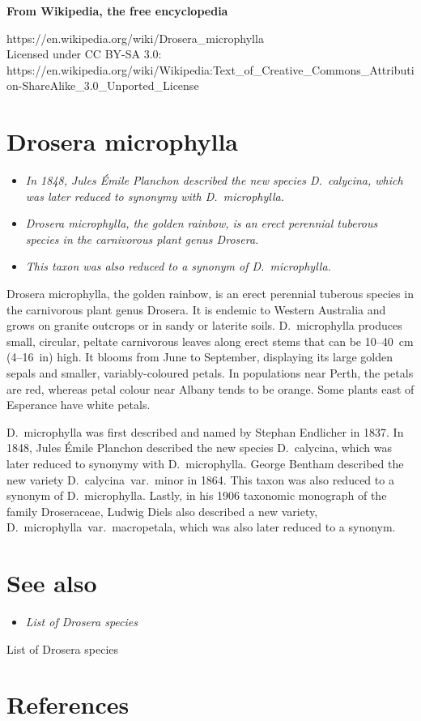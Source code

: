 \textbf{From Wikipedia, the free encyclopedia}

https://en.wikipedia.org/wiki/Drosera\_microphylla\\
Licensed under CC BY-SA 3.0:\\
https://en.wikipedia.org/wiki/Wikipedia:Text\_of\_Creative\_Commons\_Attribution-ShareAlike\_3.0\_Unported\_License

\section{Drosera microphylla}\label{drosera-microphylla}

\begin{itemize}
\item
  \emph{In 1848, Jules Émile Planchon described the new species
  D.~calycina, which was later reduced to synonymy with D.~microphylla.}
\item
  \emph{Drosera microphylla, the golden rainbow, is an erect perennial
  tuberous species in the carnivorous plant genus Drosera.}
\item
  \emph{This taxon was also reduced to a synonym of D.~microphylla.}
\end{itemize}

Drosera microphylla, the golden rainbow, is an erect perennial tuberous
species in the carnivorous plant genus Drosera. It is endemic to Western
Australia and grows on granite outcrops or in sandy or laterite soils.
D.~microphylla produces small, circular, peltate carnivorous leaves
along erect stems that can be 10--40~cm (4--16~in) high. It blooms from
June to September, displaying its large golden sepals and smaller,
variably-coloured petals. In populations near Perth, the petals are red,
whereas petal colour near Albany tends to be orange. Some plants east of
Esperance have white petals.

D.~microphylla was first described and named by Stephan Endlicher in
1837. In 1848, Jules Émile Planchon described the new species
D.~calycina, which was later reduced to synonymy with D.~microphylla.
George Bentham described the new variety D.~calycina~var.~minor in 1864.
This taxon was also reduced to a synonym of D.~microphylla. Lastly, in
his 1906 taxonomic monograph of the family Droseraceae, Ludwig Diels
also described a new variety, D.~microphylla~var.~macropetala, which was
also later reduced to a synonym.

\section{See also}\label{see-also}

\begin{itemize}
\item
  \emph{List of Drosera species}
\end{itemize}

List of Drosera species

\section{References}\label{references}
